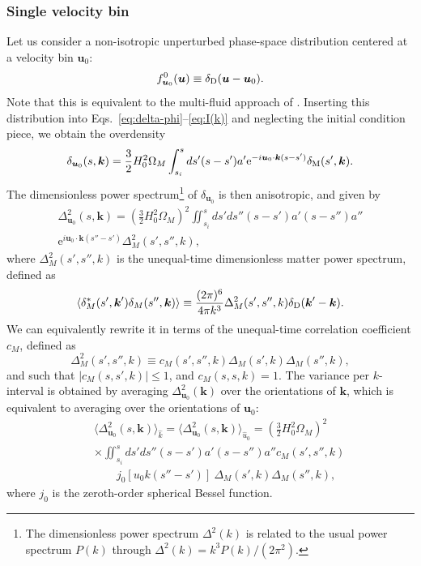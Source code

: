 \documentclass[useAMS, usenatbib]{mnras}
\newcommand{\beq}{\begin{equation}}
\newcommand{\eeq}{\end{equation}}
\newcommand{\barr}{\begin{eqnarray}}
\newcommand{\earr}{\end{eqnarray}}
\newcommand{\rme}{\textrm{e}}
\newcommand{\bs}{\boldsymbol}
\newcommand{\spb}[1]{{\textcolor{green}{[{\bf SPB}: #1]}}}
\begin{document}
\subsubsection{Single velocity bin} \label{sec:single-bin}


Let us consider a non-isotropic unperturbed phase-space distribution centered at a velocity bin $\bs{u}_0$:
\beq
f^0_{\bs{u}_0}(\bs{u}) \equiv \delta_{\rm D}(\bs{u}- \bs{u}_0).
\eeq
Note that this is equivalent to the multi-fluid approach of \cite{Dupuy_14}. Inserting this distribution into Eqs.~\eqref{eq:delta-phi}--\eqref{eq:I(k)} and neglecting the initial condition piece, we obtain the overdensity
\barr
\delta_{\bs{u}_0}(s, \bs{k}) = \frac32 H_0^2 \Omega_M \int_{s_i}^s ds' (s - s') a' \rme^{- i \bs{u}_0 \cdot \bs{k} (s - s')} \delta_{\rm M}(s', \bs{k}).
\earr
The dimensionless power spectrum\footnote{The dimensionless power spectrum $\Delta^2(k)$ is related to the usual power spectrum $P(k)$ through $\Delta^2(k) = k^3 P(k)/(2 \pi^2)$.} of $\delta_{\bs{u}_0}$ is then anisotropic, and given by
\barr
\Delta^2_{\bs{u}_0}(s, \bs{k}) =\left(\frac32 H_0^2 \Omega_M\right)^2 \iint_{s_i}^s ds' ds'' (s - s') a' (s - s'') a'' \nonumber\\
\rme^{i \bs{u}_0 \cdot \bs{k} (s'' - s')} \Delta^2_M(s', s'', k), \label{eq:P_u0}
\earr
where $\Delta^2_M(s', s'', k)$ is the unequal-time dimensionless matter power spectrum, defined as
\barr
\langle \delta_M^*(s',\bs{k}')\delta_M(s'',\bs{k})\rangle \equiv \frac{(2 \pi)^6}{4 \pi k^3} \Delta^2_M(s', s'', k) \delta_{\rm D}(\bs{k}' - \bs{k}).
\earr
We can equivalently rewrite it in terms of the unequal-time correlation coefficient $c_M$, defined as
\beq
\Delta^2_M(s', s'', k) \equiv c_M(s', s'', k) \Delta_M(s', k) \Delta_M(s'', k),
\eeq
and such that $|c_M(s, s', k)| \leq 1$, and $c_M(s, s, k) = 1$. The variance per $k$-interval is obtained by averaging $\Delta^2_{\bs{u}_0}(\bs{k})$ over the orientations of $\bs{k}$, which is equivalent to averaging over the orientations of $\bs{u}_0$:
\barr
&&\langle \Delta^2_{\bs{u}_0}(s, \bs{k})\rangle_{\hat{k}} = \langle \Delta^2_{\bs{u}_0}(s, \bs{k})\rangle_{\hat{u}_0} = \left(\frac32 H_0^2 \Omega_M\right)^2  \nonumber\\
&&\times \iint_{s_i}^s ds' ds'' (s - s') a' (s - s'') a'' c_M(s', s'', k) \nonumber\\
&&~~~~~~~~~ j_0[u_0 k (s'' - s')]~  \Delta_M (s', k) \Delta_M(s'', k), \label{eq:P_u0-av}
\earr
where $j_0$ is the zeroth-order spherical Bessel function.
\end{document}
